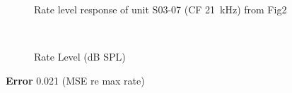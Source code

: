 \begin{figure}[htb]
  \centering
\caption{Rate level response of unit S03-07 (CF 21~kHz) from Fig2
  \citep{GhoshalKim:1997} }
\end{figure}


\begin{figure}[htb]
  \centering {}
  \\
  \caption{ Rate Level (dB SPL)}
\end{figure}


\textbf{Error} 0.021 (MSE re max rate)




